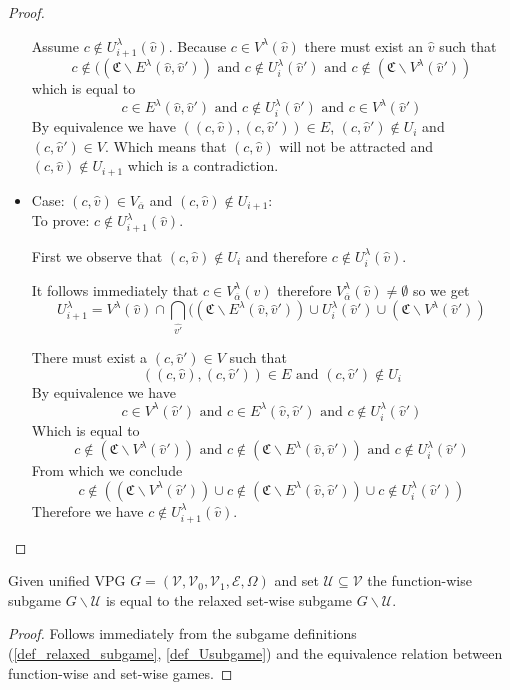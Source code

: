 \begin{lemma}
\begin{proof}
\begin{itemize}
			Assume $c \notin U^\lambda_{i+1}(\hat{v})$. Because $c \in V^\lambda(\hat{v})$ there must exist an $\hat{v}$ such that
			\[ c \notin ((\mathfrak{C} \backslash E^\lambda(\hat{v},\hat{v}')) \text{ and } c \notin U^\lambda_i(\hat{v}') \text{ and } c \notin (\mathfrak{C}\backslash V^\lambda(\hat{v}')) \]
			which is equal to
			\[ c \in E^\lambda(\hat{v},\hat{v}') \text{ and } c \notin U^\lambda_i(\hat{v}') \text{ and } c \in V^\lambda(\hat{v}') \]
			By equivalence we have $((c,\hat{v}),(c,\hat{v}')) \in E$, $(c,\hat{v}') \notin U_i$ and $(c,\hat{v}') \in V$. Which means that $(c,\hat{v})$ will not be attracted and $(c,\hat{v}) \notin U_{i+1}$ which is a contradiction.
			\item Case: $(c, \hat{v}) \in V_{\overline{\alpha}}$ and $(c,\hat{v}) \notin U_{i+1}$:\\
			To prove: $c \notin U^\lambda_{i+1}(\hat{v})$.
			
			First we observe that $(c,\hat{v}) \notin U_i$ and therefore $c \notin U^\lambda_i(\hat{v})$.
			
			It follows immediately that $c \in V^\lambda_{\overline{\alpha}}(\hat{v})$ therefore $V^\lambda_{\overline{\alpha}}(\hat{v}) \neq \emptyset$ so we get
			\[ U^\lambda_{i+1} =V^\lambda(\hat{v}) \cap \bigcap_{\hat{v'}}((\mathfrak{C} \backslash E^\lambda(\hat{v},\hat{v}')) \cup U^\lambda_i(\hat{v}') \cup (\mathfrak{C}\backslash V^\lambda(\hat{v}')) \]
			
			There must exist a $(c,\hat{v}') \in V$ such that 
			\[ ((c,\hat{v}),(c,\hat{v}')) \in E  \text{ and } (c,\hat{v}') \notin U_i \]
			By equivalence we have 
			\[ c \in V^\lambda(\hat{v}')  \text{ and } c \in E^\lambda(\hat{v},\hat{v}')  \text{ and } c \notin U^\lambda_i(\hat{v}') \]
			Which is equal to
			\[ c \notin (\mathfrak{C} \backslash V^\lambda(\hat{v}'))  \text{ and } c \notin (\mathfrak{C} \backslash E^\lambda(\hat{v},\hat{v}'))  \text{ and } c \notin U^\lambda_i(\hat{v}') \]
			From which we conclude
			\[ c \notin ((\mathfrak{C} \backslash V^\lambda(\hat{v}')) \cup c \notin (\mathfrak{C} \backslash E^\lambda(\hat{v},\hat{v}')) \cup c \notin U^\lambda_i(\hat{v}')) \]
			Therefore we have $c \notin U^\lambda_{i+1}(\hat{v})$.
		\end{itemize}
	\end{proof}
\end{lemma}
\begin{lemma}
	\label{lem_subgame_eq}
	Given unified VPG $G = (\mathcal{V},\mathcal{V}_0,\mathcal{V}_1, \mathcal{E}, \Omega)$ and set $\mathcal{U} \subseteq \mathcal{V}$ the function-wise subgame $G \backslash \mathcal{U}$ is equal to the relaxed set-wise subgame $G \backslash \mathcal{U}$.
	\begin{proof}
		Follows immediately from the subgame definitions (\ref{def_relaxed_subgame}, \ref{def_Usubgame}) and the equivalence relation between function-wise and set-wise games.
	\end{proof}
\end{lemma}


